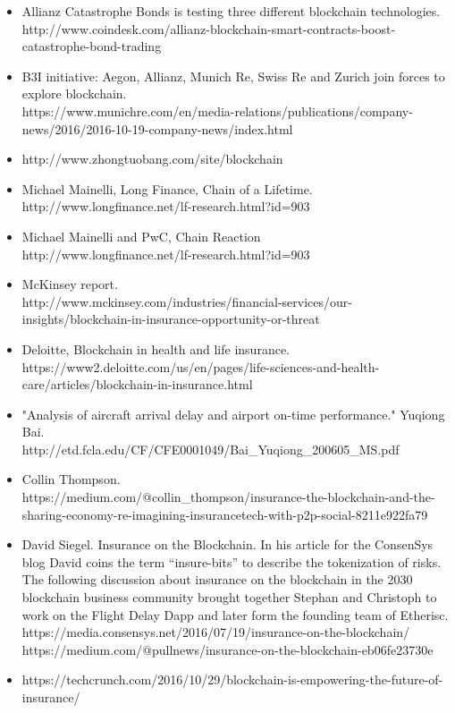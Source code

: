 \documentclass[12pt]{article}
\begin{document}
\begin{itemize}
    \item Allianz Catastrophe Bonds is testing three different blockchain technologies.\\ http://www.coindesk.com/allianz-blockchain-smart-contracts-boost-catastrophe-bond-trading
    \item B3I initiative: Aegon, Allianz, Munich Re, Swiss Re and Zurich join forces to explore blockchain.\\https://www.munichre.com/en/media-relations/publications/company-news/2016/2016-10-19-company-news/index.html
    \item http://www.zhongtuobang.com/site/blockchain
    \item Michael Mainelli, Long Finance, Chain of a Lifetime.\\ http://www.longfinance.net/lf-research.html?id=903
    \item Michael Mainelli and PwC, Chain Reaction\\ http://www.longfinance.net/lf-research.html?id=903
    \item McKinsey report.\\ http://www.mckinsey.com/industries/financial-services/our-insights/blockchain-in-insurance-opportunity-or-threat
    \item Deloitte, Blockchain in health and life insurance.\\ https://www2.deloitte.com/us/en/pages/life-sciences-and-health-care/articles/blockchain-in-insurance.html
    \item "Analysis of aircraft arrival delay and airport on-time performance." Yuqiong Bai.\\ http://etd.fcla.edu/CF/CFE0001049/Bai\_Yuqiong\_200605\_MS.pdf
    \item Collin Thompson.\\ https://medium.com/@collin\_thompson/insurance-the-blockchain-and-the-sharing-economy-re-imagining-insurancetech-with-p2p-social-8211e922fa79
    \item David Siegel. Insurance on the Blockchain. In his article for the ConsenSys blog David coins the term “insure-bits” to describe the tokenization of risks. The following discussion about insurance on the blockchain in the 2030 blockchain business community brought together Stephan and Christoph to work on the Flight Delay Dapp and later form the founding team of Etherisc.\\https://media.consensys.net/2016/07/19/insurance-on-the-blockchain/\\https://medium.com/@pullnews/insurance-on-the-blockchain-eb06fe23730e
    \item https://techcrunch.com/2016/10/29/blockchain-is-empowering-the-future-of-insurance/ 
\end{itemize}
\end{document}
